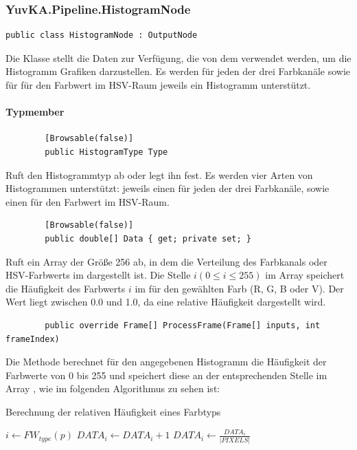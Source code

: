 \subsubsection{YuvKA.Pipeline.HistogramNode}

\begin{verbatim}
public class HistogramNode : OutputNode
\end{verbatim}
Die Klasse  stellt die Daten zur Verfügung, die von dem  verwendet werden, um die Histogramm Grafiken darzustellen. Es werden für jeden der drei Farbkanäle sowie für für den Farbwert im HSV-Raum jeweils ein Histogramm unterstützt.

\paragraph{Typmember}
\begin{itemize}
	\begin{verbatim}
		[Browsable(false)]
		public HistogramType Type
	\end{verbatim}
	Ruft den Histogrammtyp ab oder legt ihn fest. Es werden vier Arten von Histogrammen unterstützt: jeweils einen für jeden der drei Farbkanäle, sowie einen für den Farbwert im HSV-Raum.
	
	\begin{verbatim}
		[Browsable(false)]
		public double[] Data { get; private set; }
	\end{verbatim}
	Ruft ein Array der Größe 256 ab, in dem die Verteilung des Farbkanals oder HSV-Farbwerts im  dargestellt ist. Die Stelle $ i (0 \leq i \leq 255) $ im Array speichert die Häufigkeit des Farbwerts $ i $ im  für den gewählten Farb (R, G, B oder V). Der Wert liegt zwischen 0.0 und 1.0, da eine relative Häufigkeit dargestellt wird.

	\begin{verbatim}
		public override Frame[] ProcessFrame(Frame[] inputs, int frameIndex)
	\end{verbatim}
	Die Methode  berechnet für den angegebenen Histogramm die Häufigkeit der Farbwerte von 0 bis 255 und speichert diese an der entsprechenden Stelle im Array , wie im folgenden Algorithmus zu sehen ist:
	\begin{algorithm}
		\caption{Berechnung der relativen Häufigkeit eines Farbtyps}
		\begin{algorithmic}[1]
			\STATE {}
				\STATE $ i \gets FW_{type}(p) $
				\STATE $ DATA_i \gets DATA_i + 1 $
			\ENDFOR
				\STATE $ DATA_i \gets \frac{DATA_i}{|PIXELS|} $
			\ENDFOR
		\end{algorithmic}
	\end{algorithm}

\end{itemize}

